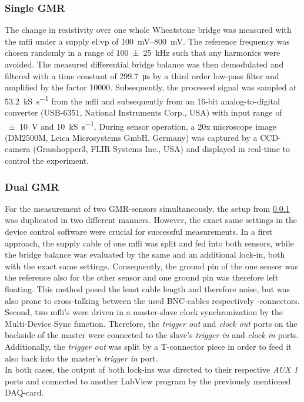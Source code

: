 \subsubsection{Single GMR} \label{sec:meth:singleGMR}
The change in resistivity over one whole Wheatstone bridge was measured with the \gls{mfli} under a supply \gls{el:vp} of \SIrange{100}{800}{\milli\volt}. The reference frequency was chosen randomly in a range of \SI{100(25)}{\kHz} such that any harmonics were avoided. The measured differential bridge balance was then demodulated and filtered with a time constant of \SI{299.7}{\micro\second} by a third order low-pass filter and amplified by the factor \num{10000}. Subsequently, the processed signal was sampled at \SI{53.2}{\kilo\siemens\per\second} from the \gls{mfli} and subsequently from an 16-bit analog-to-digital converter (USB-6351, National Instruments Corp., USA) with input range of \SI{+-10}{\volt} and  \SI{10}{\kilo\siemens\per\second}.\newline
During sensor operation, a 20x microscope image (DM2500M, Leica Microsystems GmbH, Germany) was captured by a CCD-camera (Grasshopper3, FLIR Systems Inc., USA) and displayed in real-time to control the experiment.
\subsubsection{Dual GMR}
\label{sec:meth:dualGMR}
For the measurement of two GMR-sensors simultaneously, the setup from \ref{sec:meth:singleGMR} was duplicated in two different manners. However, the exact same settings in the device control software were crucial for successful measurements.  In a first approach, the supply cable of one \gls{mfli} was split and fed into both sensors, while the bridge balance was evaluated by the same and an additional lock-in, both with the exact same settings. Consequently, the ground pin of the one sensor was the reference also for the other sensor and one ground pin was therefore left floating. This method posed the least cable length and therefore noise, but was also prone to cross-talking between the used BNC-cables respectively -connectors.\\
Second, two \gls{mfli}'s were driven in a master-slave clock synchronization by the Multi-Device Sync function. Therefore, the \textit{trigger out} and \textit{clock out} ports on the backside of the master were connected to the slave's \textit{trigger in} and \textit{clock in} ports. Additionally, the \textit{trigger out} was split by a T-connector piece in order to feed it also back into the master's \textit{trigger in} port.\\
In both cases, the output of both lock-ins was directed to their respective \textit{AUX 1} ports and connected to another LabView program by the previously mentioned DAQ-card.
